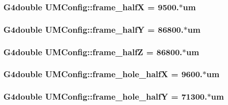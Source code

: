 \subsubsection[{frame\+\_\+half\+X}]{\setlength{\rightskip}{0pt plus 5cm}G4double U\+M\+Config\+::frame\+\_\+half\+X = 9500.$\ast$um}\label{structUMConfig_aafe2777462b266d6e826f29780f41734}
\hypertarget{structUMConfig_a1c381ab5ce297e813cdd3b107c3b3273}{}
\subsubsection[{frame\+\_\+half\+Y}]{\setlength{\rightskip}{0pt plus 5cm}G4double U\+M\+Config\+::frame\+\_\+half\+Y = 86800.$\ast$um}\label{structUMConfig_a1c381ab5ce297e813cdd3b107c3b3273}
\hypertarget{structUMConfig_aadc0e348b160d53a5a5b86ff0574c6d0}{}
\subsubsection[{frame\+\_\+half\+Z}]{\setlength{\rightskip}{0pt plus 5cm}G4double U\+M\+Config\+::frame\+\_\+half\+Z = 86800.$\ast$um}\label{structUMConfig_aadc0e348b160d53a5a5b86ff0574c6d0}
\hypertarget{structUMConfig_a5904fb1d13dd60fcb6a50de8e5789340}{}
\subsubsection[{frame\+\_\+hole\+\_\+half\+X}]{\setlength{\rightskip}{0pt plus 5cm}G4double U\+M\+Config\+::frame\+\_\+hole\+\_\+half\+X = 9600.$\ast$um}\label{structUMConfig_a5904fb1d13dd60fcb6a50de8e5789340}
\hypertarget{structUMConfig_a1722d57024f27b74d518c5abf804e096}{}
\subsubsection[{frame\+\_\+hole\+\_\+half\+Y}]{\setlength{\rightskip}{0pt plus 5cm}G4double U\+M\+Config\+::frame\+\_\+hole\+\_\+half\+Y = 71300.$\ast$um}\label{structUMConfig_a1722d57024f27b74d518c5abf804e096}
\hypertarget{structUMConfig_ac793ed9de1cb61e5a19e27ca6ca2bee8}{}
